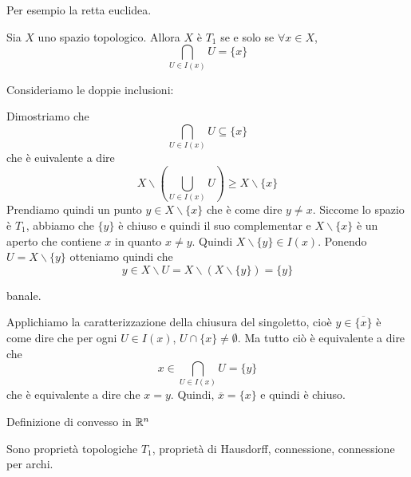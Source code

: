 \documentclass[a4paper]{article}
\begin{document}
Per esempio la retta euclidea.

\begin{snippetproposition}{}
    Sia \(X\) uno spazio topologico.
    Allora \(X\) è \(T_1\) se e solo se
    \(\forall x\in X\),
    \[
        \bigcap_{U \in I(x)} U = \{x\}
    \]
\end{snippetproposition}

\begin{snippetproof}{}
    \begin{iffproof}
        \item Consideriamo le doppie inclusioni:
        \begin{doubleinclusion}
            \item Dimostriamo che
            \[
                \bigcap_{U \in I(x)} U \subseteq \{x\}
            \]
            che è euivalente a dire
            \[
                X \backslash \left(
                    \bigcup_{U \in I(x)} U
                \right) \geq X \backslash \{x\}
            \]
            Prendiamo quindi un punto \(y \in X \backslash \{x\}\)
            che è come dire \(y\neq x\).
            Siccome lo spazio è \(T_1\),
            abbiamo che \(\{y\}\) è chiuso e quindi
            il suo complementar e \(X \backslash \{x\}\) è un aperto che contiene \(x\)
            in quanto \(x\neq y\).
            Quindi \(X \backslash \{y\} \in I(x)\).
            Ponendo \(U = X \backslash \{y\}\)
            otteniamo quindi che \[y \in X \backslash U = X \backslash (X \backslash \{y\}) = \{y\}\]
            \item banale.
        \end{doubleinclusion}
        \item Applichiamo la caratterizzazione della chiusura del singoletto,
        cioè \(y \in \overline{\{x\}}\) è come dire che per ogni \(U \in I(x)\),
        \(U \cap \{x\} \neq \emptyset\).
        Ma tutto ciò è equivalente a dire che
        \[
            x \in \bigcap_{U \in I(x)} U = \{y\}
        \]
        che è equivalente a dire che \(x=y\).
        Quindi, \(\overline{x} = \{x\}\) e quindi è chiuso.
    \end{iffproof}
\end{snippetproof}

\begin{snippetdefinition}{Definizione di convesso in \(\mathbb{R}^n\)}
    \todo
\end{snippetdefinition}

Sono proprietà topologiche \(T_1\), proprietà di Hausdorff, connessione,
connessione per archi.
\end{document}
